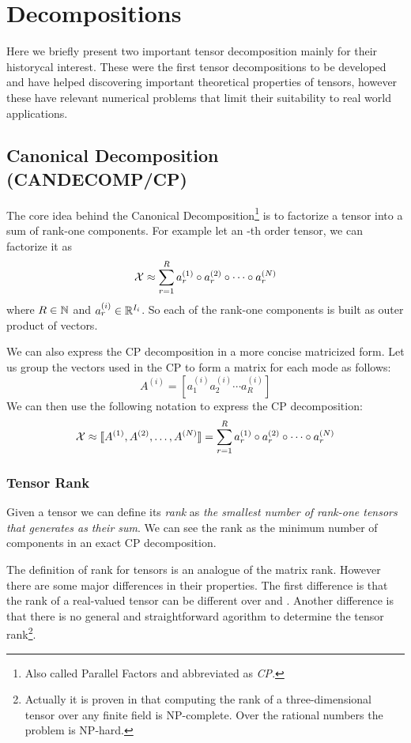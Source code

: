 \chapter{Decompositions}
Here we briefly present two important tensor decomposition mainly for their historycal interest. These were the first tensor decompositions to be developed and have helped discovering important theoretical properties of tensors, however these have relevant numerical problems that limit their suitability to real world applications.

\section{Canonical Decomposition (CANDECOMP/CP)}
The core idea behind the Canonical Decomposition\footnote{Also called Parallel Factors and abbreviated as \emph{CP}.} is to factorize a tensor into a sum of rank-one components. For example let \X an \N-th order tensor, we can factorize it as
\begin{equation}
  \mathcal{X} \approx \sum_{r = 1}^R a_r^{(1)} \circ a_r^{(2)} \circ \cdots \circ a_r^{(N)}
\end{equation}
where $R \in \mathbb{N}$ and $a_r^{(i)} \in \mathbb{R}^{I_i}$. So each of the rank-one components is built as outer product of \N vectors.

We can also express the CP decomposition in a more concise matricized form.
Let us group the vectors used in the CP to form a matrix for each mode  as follows:
\begin{equation*}
  A^{(i)} = [ a^{(i)}_1 a^{(i)}_2 \cdots a^{(i)}_R ]
\end{equation*}
We can then use the following notation to express the CP decomposition:
\begin{equation*}
  \mathcal{X} \approx \llbracket A^{(1)}, A^{(2)}, \ldots, A^{(N)} \rrbracket = \sum_{r = 1}^R a_r^{(1)} \circ a_r^{(2)} \circ \cdots \circ a_r^{(N)}
\end{equation*}

\subsection{Tensor Rank}
Given a tensor \X we can define its \emph{rank} as \emph{the smallest number of rank-one tensors that generates \X as their sum}. We can see the rank as the minimum number of components in an exact CP decomposition.

The definition of rank for tensors is an analogue of the matrix rank. However there are some major differences in their properties.
The first difference is that the rank of a real-valued tensor can be different over \RR and \CC {}. Another difference is that there is no general and straightforward agorithm to determine the tensor rank\footnote{Actually it is proven in \cite{rankNP} that computing the rank of a three-dimensional tensor over any finite field is NP-complete. Over the rational numbers the problem is NP-hard.}.

